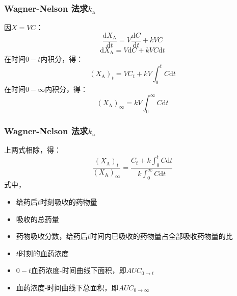 \documentclass[dvipsnames, svgnames, x11names]{beamer}
\begin{document}
\begin{frame}
    \frametitle{Wagner-Nelson 法求$k_\mathrm{a}$}
    因$X=VC$：
    \[
        \frac{\mathrm{d}X_{\mathrm{A}}}{\mathrm{d}t}=V\frac{\mathrm{d}C}{\mathrm{d}t}+kVC
    \]
    \[
        \mathrm{d}X_{\mathrm{A}} = V\mathrm{d}C + kVC\mathrm{d}t
    \]
    在时间$0-t$内积分，得：
    \[
        (X_{\mathrm{A}})_{t}=VC_{t}+kV\int_{0}^{t}C\mathrm{d}t
    \]
    在时间$0-\infty$内积分，得：
    \[
        (X_{\mathrm{A}})_{\infty}=kV\int_{0}^{\infty}C\mathrm{d}t
    \]
\end{frame}


\begin{frame}
    \frametitle{Wagner-Nelson 法求$k_\mathrm{a}$}
    上两式相除，得：
    \[
        \frac{(X_{\mathrm{A}})_{t}}{(X_{\mathrm{A}})_{\infty}}=\frac{C_{t}+k\int_{0}^{t}C\mathrm{d}t}{k\int_{0}^{\infty}C\mathrm{d}t}
    \]
    式中，

    \begin{minipage}{0.08\linewidth}
        
    \end{minipage}\hfill
    \begin{minipage}{0.88\linewidth}
        \begin{itemize}
            \item[$(X_{\mathrm{A}})_{t}$：] 给药后$t$时刻吸收的药物量
            \item[$(X_{\mathrm{A}})_{\infty}$：] 吸收的总药量
            \item[$\frac{(X_{\mathrm{A}})_{t}}{(X_{\mathrm{A}})_{\infty}}$：] 药物吸收分数，给药后$t$时间内已吸收的药物量占全部吸收药物量的比
            \item[$C_{t}$：] $t$时刻的血药浓度
            \item[$\int_{0}^{t}C\mathrm{d}t$：] $0-t$血药浓度-时间曲线下面积，即$AUC_{0\to t}$
            \item[$\int_{0}^{\infty}C\mathrm{d}t$：] 血药浓度-时间曲线下总面积，即$AUC_{0\to \infty}$
          \end{itemize}
    \end{minipage}
\end{frame}
\end{document}
